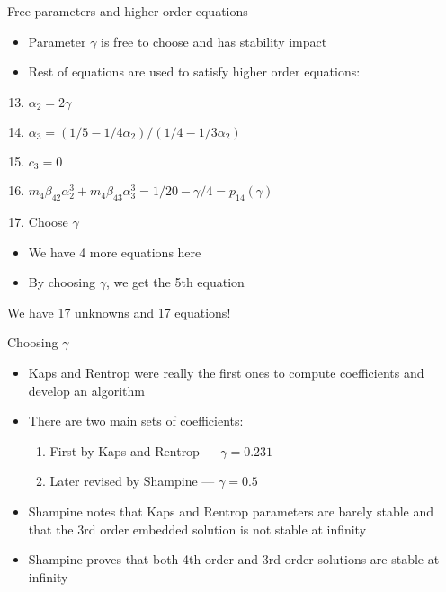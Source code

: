 \documentclass[serif]{beamer}
\begin{document}
\begin{frame}{Free parameters and higher order equations}
  \begin{itemize}
   \item<1-> Parameter $\gamma$ is free to choose and has stability impact
   \item<1-> Rest of equations are used to satisfy higher order equations:
  \end{itemize}
  \begin{enumerate}
   \setcounter{enumi}{12}
   \item<1-> $\alpha_2 = 2\gamma$
   \item<1-> $\alpha_3 = \left(1/5 - 1/4\alpha_2\right)/\left(1/4 - 1/3\alpha_2\right)$
   \item<1-> $c_3 = 0$
   \item<1-> $m_4\beta_{42}\alpha_2^3 + m_4\beta_{43}\alpha_3^3 = 1/20 - \gamma/4 = p_{14}\left(\gamma\right)$
   \item<1-> Choose $\gamma$
  \end{enumerate}
  \begin{itemize}
   \item<1-> We have 4 more equations here
   \item<1-> By choosing $\gamma$, we get the 5th equation
  \end{itemize}
  \begin{center}
    \alert{We have 17 unknowns and 17 equations!} 
  \end{center}
\end{frame}
\begin{frame}{Choosing $\gamma$}
  \begin{itemize}
    \item Kaps and Rentrop were really the first ones to compute coefficients and develop an algorithm \vfill
    \item There are two main sets of coefficients: \vfill
    \begin{enumerate}
      \item First by Kaps and Rentrop --- $\gamma = 0.231$
      \item Later revised by Shampine --- $\gamma = 0.5$
    \end{enumerate}
    \item Shampine notes that Kaps and Rentrop parameters are barely stable and that the 3rd order embedded solution is not stable at infinity\vfill
    \item Shampine proves that both 4th order and 3rd order solutions are stable at infinity
  \end{itemize}
\end{frame}
\end{document}
